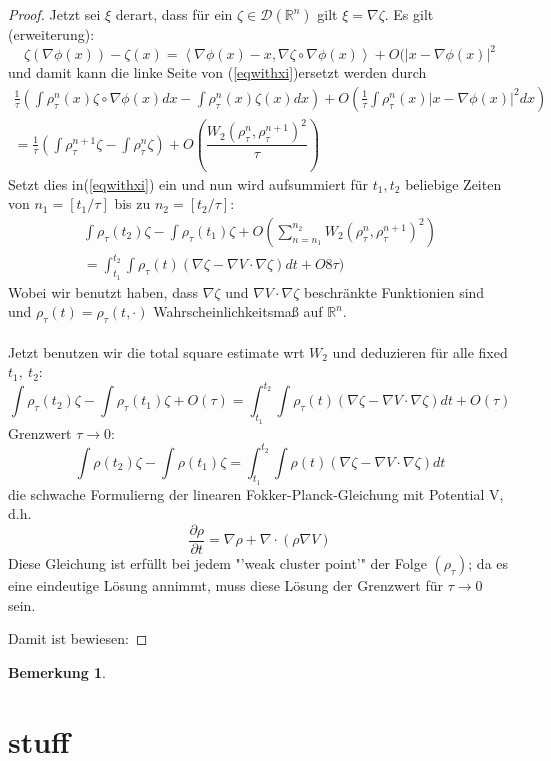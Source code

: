 \documentclass[11pt,a4paper,notitlepage]{scrreprt}
\newcommand{\RR}{\mathbb{R}}
\newtheorem{bem}[defi]{Bemerkung}
\begin{document}
\begin{proof}
Jetzt sei $\xi$ derart, dass für ein $\zeta\in\mathcal{D}(\RR^n)$ gilt $\xi=\nabla\zeta$. Es gilt (erweiterung):
\begin{equation}
\zeta(\nabla\phi(x))-\zeta(x)=\left\langle\nabla\phi(x)-x,\nabla\zeta\circ\nabla\phi(x)\right\rangle+O(\vert x-\nabla\phi(x)\vert^2
\end{equation}
und damit kann die linke Seite von (\ref{eqwithxi})ersetzt werden durch
\begin{align*}
\frac{1}{\tau}\left(\int \rho_\tau^n(x)\zeta\circ\nabla\phi(x)dx-\int\rho_\tau^n(x)\zeta(x)dx\right)+O\left(\frac{1}{\tau}\int\rho_\tau^n(x)\vert x-\nabla\phi(x)\vert^2dx\right)\\
=\frac{1}{\tau}\left(\int\rho_\tau^{n+1}\zeta-\int\rho_\tau^n\zeta\right)+O\left(\dfrac{W_2(\rho_\tau^n,\rho_\tau^{n+1})^2}{\tau}\right)
\end{align*}
Setzt dies in(\ref{eqwithxi}) ein und  nun wird aufsummiert für $t_1,t_2$ beliebige Zeiten von $n_1=[t_1/\tau]$ bis zu $n_2=[t_2/\tau]$:
\begin{eqnarray}
\int\rho_\tau(t_2)\zeta-\int\rho_\tau(t_1)\zeta+O\left(\sum_{n=n_1}^{n_2}W_2(\rho_\tau^n,\rho_\tau^{n+1})^2\right)\\
=\int_{t_1}^{t_2}\int\rho_\tau(t)(\nabla\zeta-\nabla V\cdot\nabla\zeta)dt+O8\tau)
\end{eqnarray}
Wobei wir benutzt haben, dass $\nabla\zeta$ und $\nabla V\cdot\nabla\zeta$ beschränkte Funktionien sind und $\rho_\tau(t)=\rho_\tau(t,\cdot)$ Wahrscheinlichkeitsmaß auf $\RR^n$.\\\\
Jetzt benutzen wir die total square estimate wrt $W_2$ und deduzieren für alle fixed $t_1,~t_2$:
\begin{equation}
\int\rho_\tau(t_2)\zeta-\int\rho_\tau(t_1)\zeta+O(\tau)=\int_{t_1}^{t_2}\int\rho_\tau(t)(\nabla\zeta-\nabla V\cdot\nabla\zeta)dt+O(\tau)
\end{equation}
Grenzwert $\tau\to 0$:
\begin{equation}
\int\rho(t_2)\zeta-\int\rho(t_1)\zeta=\int_{t_1}^{t_2}\int\rho(t)(\nabla\zeta-\nabla V\cdot\nabla\zeta)dt
\end{equation}
die schwache Formulierng der linearen Fokker-Planck-Gleichung mit Potential V, d.h.
\begin{equation}
\dfrac{\partial\rho}{\partial t}=\nabla\rho+\nabla\cdot(\rho\nabla V)
\end{equation}
Diese Gleichung ist erfüllt bei jedem "'weak cluster point'" der Folge $(\rho_\tau)$; da es eine eindeutige Lösung annimmt, muss diese Lösung der Grenzwert für $\tau\to 0$ sein.

Damit ist bewiesen:
\end{proof}

\begin{bem}
\end{bem}

\section{stuff}
\end{document}
